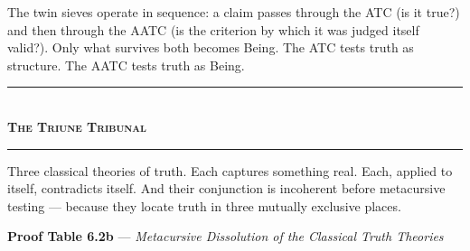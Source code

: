 \documentclass[10pt, openany, oneside]{book}
\renewcommand{\normalsize}{\fontsize{10}{13}\selectfont}
\begin{document}
The twin sieves operate in sequence: a claim passes through the ATC (is it true?) and then through the AATC (is the criterion by which it was judged itself valid?). Only what survives both becomes Being. The ATC tests truth as structure. The AATC tests truth as Being.

\vspace{1.5em}


\begin{center}
    \rule{0.3\textwidth}{0.4pt}\\[0.5em]
    {\normalsize\bfseries\scshape The Triune Tribunal}\\[0.3em]
    \rule{0.3\textwidth}{0.4pt}
\end{center}

\vspace{1em}

\noindent Three classical theories of truth. Each captures something real. Each, applied to itself, contradicts itself. And their conjunction is incoherent before metacursive testing --- because they locate truth in three mutually exclusive places.

\vspace{0.5em}

\textbf{Proof Table 6.2b} --- \textit{Metacursive Dissolution of the Classical Truth Theories}

\vspace{0.5em}
\end{document}
